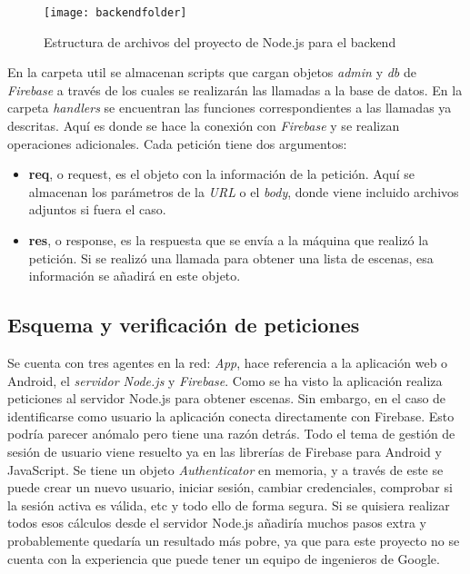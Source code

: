\begin{figure}[h]
    \centering
    \texttt{[image: backendfolder]}
    \caption[Estructura de archivos de backend]{Estructura de archivos del proyecto de Node.js para el backend}
\end{figure}

En la carpeta util se almacenan scripts que cargan objetos \textit{admin} y \textit{db} de \textit{Firebase} a través de los cuales se realizarán las llamadas a la base de datos. En la carpeta \textit{handlers} se encuentran las funciones correspondientes a las llamadas ya descritas. Aquí es donde se hace la conexión con \textit{Firebase} y se realizan operaciones adicionales. Cada petición tiene dos argumentos:

\begin{itemize}
    \item \textbf{req}, o request, es el objeto con la información de la petición. Aquí se almacenan los parámetros de la \textit{URL} o el \textit{body}, donde viene incluido archivos adjuntos si fuera el caso.
    \item \textbf{res}, o response, es la respuesta que se envía a la máquina que realizó la petición. Si se realizó una llamada para obtener una lista de escenas, esa información se añadirá en este objeto.
\end{itemize}

\subsection{Esquema y verificación de peticiones}

Se cuenta con tres agentes en la red: \textit{App}, hace referencia a la aplicación web o Android, el \textit{servidor Node.js} y \textit{Firebase}. Como se ha visto la aplicación realiza peticiones al servidor Node.js para obtener escenas. Sin embargo, en el caso de identificarse como usuario la aplicación conecta directamente con Firebase. Esto podría parecer anómalo pero tiene una razón detrás. Todo el tema de gestión de sesión de usuario viene resuelto ya en las librerías de Firebase para Android y JavaScript. Se tiene un objeto \textit{Authenticator} en memoria, y a través de este se puede crear un nuevo usuario, iniciar sesión, cambiar credenciales, comprobar si la sesión activa es válida, etc y todo ello de forma segura. Si se quisiera realizar todos esos cálculos desde el servidor Node.js añadiría muchos pasos extra y probablemente quedaría un resultado más pobre, ya que para este proyecto no se cuenta con la experiencia que puede tener un equipo de ingenieros de Google.

